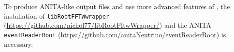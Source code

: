 To produce ANITA-like output files and use more advanced features of \icemc, the installation of \texttt{libRootFFTWwrapper} (\url{https://github.com/nichol77/libRootFftwWrapper/}) and the ANITA \texttt{eventReaderRoot} (\url{https://github.com/anitaNeutrino/eventReaderRoot}) is necessary. 




